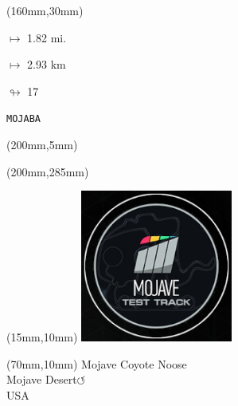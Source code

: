 \begin{textblock*}{40mm}(160mm,30mm)%
\Large
\par$\mapsto$ 1.82 mi.
\par$\mapsto$ 2.93 km
\par$\looparrowright$ 17
\par\hfill\tiny\tt MOJABA\\
\end{textblock*}
\begin{textblock*}{20mm}(200mm,5mm)%
\fbox{\thepage}
\label{MOJABA}
\end{textblock*}
\begin{textblock*}{20mm}(200mm,285mm)%
\fbox{\thepage}
\end{textblock*}

\null\newpage
\begin{textblock*}{50mm}(15mm,10mm)%
\includegraphics[width=50mm]{LG/MOJA.png}
\end{textblock*}
\begin{textblock*}{130mm}(70mm,10mm)%
{\fontsize{20}{20}\selectfont Mojave Coyote Noose\\}
{\fontsize{16}{16}\selectfont Mojave Desert\hfill \Large$\circlearrowleft$\\}
{\fontsize{12}{12}\selectfont USA\\}
\end{textblock*}
